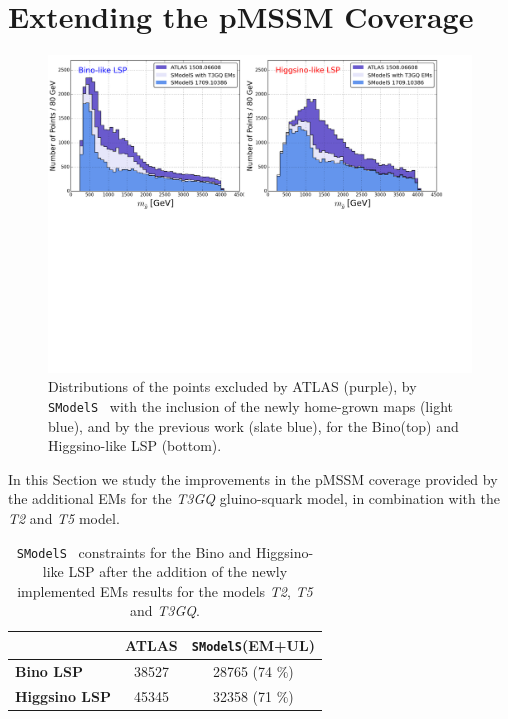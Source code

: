 \documentclass[a4paper,11pt]{article}
\newcommand{\SMO}{\texttt{SModelS\xspace}}
\begin{document}
\section{Extending the pMSSM Coverage}\label{sec::impact}
\begin{figure}
	\begin{center}
		\includegraphics[width=1\textwidth]{PLOTS/New/New_Res.pdf}	
	\end{center}
	\caption{Distributions of the points excluded by ATLAS (purple), by \SMO~ with the inclusion of the newly home-grown maps (light blue), and by the previous work \cite{Ambrogi:2017lov} (slate blue), for the Bino(top) and Higgsino-like LSP (bottom).}
	\label{pmssm_new_exclusion_gluino}
\end{figure}
In this Section we study the improvements in the pMSSM coverage provided by the additional EMs for the \textit{T3GQ} gluino-squark model, in combination with the \textit{T2} and \textit{T5} model. 
\\
%
\begin{table}[!h]
	\footnotesize
	\begin{center}
		\renewcommand{\arraystretch}{1.2}
		\begin{tabular}{l c c }    \toprule 
			& \textbf{ATLAS} & \textbf{\SMO (EM+UL)} \\  \toprule 
			\textbf{Bino LSP} & 38527 & 28765 (74 $\% $) \\ 
			\textbf{Higgsino LSP} & 45345 & 32358 (71 $\% $) \\    \bottomrule  
		\end{tabular}
	\end{center}
	\caption{\SMO~ constraints for the Bino and Higgsino-like LSP after the addition of the newly implemented EMs results for the models \textit{T2}, \textit{T5} and \textit{T3GQ}.}
	\label{Res_Tab_New}
\end{table}
\end{document}
